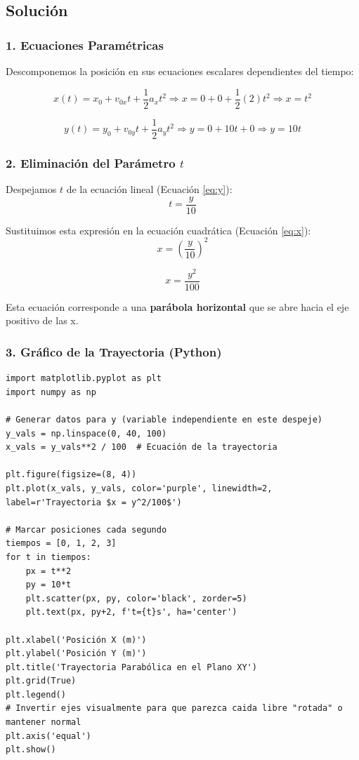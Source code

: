 \documentclass[12pt, a4paper]{article}
\begin{document}
\subsection*{Solución}

\subsubsection*{1. Ecuaciones Paramétricas}
Descomponemos la posición en sus ecuaciones escalares dependientes del tiempo:

\begin{equation} \label{eq:x}
    x(t) = x_0 + v_{0x}t + \frac{1}{2}a_x t^2 \Rightarrow x = 0 + 0 + \frac{1}{2}(2)t^2 \Rightarrow \boxed{x = t^2}
\end{equation}

\begin{equation} \label{eq:y}
    y(t) = y_0 + v_{0y}t + \frac{1}{2}a_y t^2 \Rightarrow y = 0 + 10t + 0 \Rightarrow \boxed{y = 10t}
\end{equation}

\subsubsection*{2. Eliminación del Parámetro $t$}
Despejamos $t$ de la ecuación lineal (Ecuación \ref{eq:y}):
$$ t = \frac{y}{10} $$

Sustituimos esta expresión en la ecuación cuadrática (Ecuación \ref{eq:x}):
$$ x = \left( \frac{y}{10} \right)^2 $$

$$ x = \frac{y^2}{100} $$

Esta ecuación corresponde a una \textbf{parábola horizontal} que se abre hacia el eje positivo de las x.

\subsubsection*{3. Gráfico de la Trayectoria (Python)}
\begin{verbatim}
import matplotlib.pyplot as plt
import numpy as np

# Generar datos para y (variable independiente en este despeje)
y_vals = np.linspace(0, 40, 100)
x_vals = y_vals**2 / 100  # Ecuación de la trayectoria

plt.figure(figsize=(8, 4))
plt.plot(x_vals, y_vals, color='purple', linewidth=2, label=r'Trayectoria $x = y^2/100$')

# Marcar posiciones cada segundo
tiempos = [0, 1, 2, 3]
for t in tiempos:
    px = t**2
    py = 10*t
    plt.scatter(px, py, color='black', zorder=5)
    plt.text(px, py+2, f't={t}s', ha='center')

plt.xlabel('Posición X (m)')
plt.ylabel('Posición Y (m)')
plt.title('Trayectoria Parabólica en el Plano XY')
plt.grid(True)
plt.legend()
# Invertir ejes visualmente para que parezca caida libre "rotada" o mantener normal
plt.axis('equal') 
plt.show()
\end{verbatim}
\end{document}
